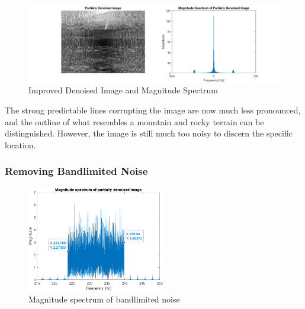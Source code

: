 \documentclass[12pt]{article}
\begin{document}
\begin{figure}[ht]
    \centering
    \includegraphics{figures/p2-im1improved.png}
    \caption{Improved Denoised Image and Magnitude Spectrum\label{fig:p2-im1improved}}
\end{figure}

The strong predictable lines corrupting the image are now much less pronounced,
and the outline of what resembles a mountain and rocky terrain can be
distinguished. However, the image is still much too noisy to discern the
specific location.

\subsubsection*{Removing Bandlimited Noise}

\begin{figure}
    \vspace*{-12pt}
    \centering
    \includegraphics[width=6cm]{figures/p2-bandnoise.png}
    \caption{Magnitude spectrum of bandlimited noise\label{fig:p2-bandnoise}}
\end{figure}
\end{document}
